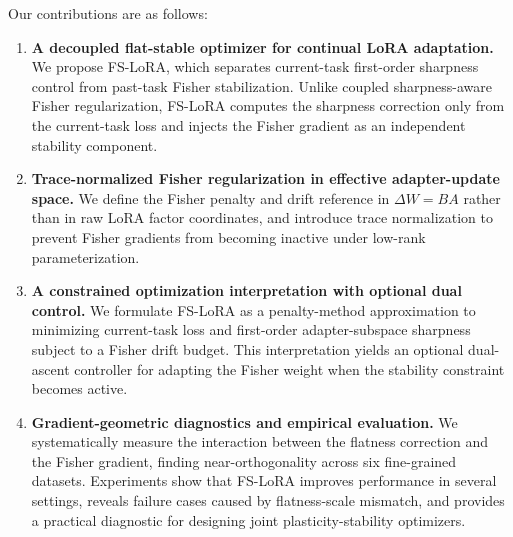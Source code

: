 Our contributions are as follows:
\begin{enumerate}
    \item \textbf{A decoupled flat-stable optimizer for continual LoRA adaptation.}
    We propose FS-LoRA, which separates current-task first-order sharpness control from past-task Fisher stabilization.
    Unlike coupled sharpness-aware Fisher regularization, FS-LoRA computes the sharpness correction only from the current-task loss and injects the Fisher gradient as an independent stability component.

    \item \textbf{Trace-normalized Fisher regularization in effective adapter-update space.}
    We define the Fisher penalty and drift reference in $\Delta W=BA$ rather than in raw LoRA factor coordinates, and introduce trace normalization to prevent Fisher gradients from becoming inactive under low-rank parameterization.

    \item \textbf{A constrained optimization interpretation with optional dual control.}
    We formulate FS-LoRA as a penalty-method approximation to minimizing current-task loss and first-order adapter-subspace sharpness subject to a Fisher drift budget.
    This interpretation yields an optional dual-ascent controller for adapting the Fisher weight when the stability constraint becomes active.

    \item \textbf{Gradient-geometric diagnostics and empirical evaluation.}
    We systematically measure the interaction between the flatness correction and the Fisher gradient, finding near-orthogonality across six fine-grained datasets.
    Experiments show that FS-LoRA improves performance in several settings, reveals failure cases caused by flatness-scale mismatch, and provides a practical diagnostic for designing joint plasticity-stability optimizers.
\end{enumerate}